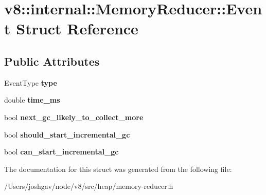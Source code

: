\hypertarget{structv8_1_1internal_1_1_memory_reducer_1_1_event}{}\section{v8\+:\+:internal\+:\+:Memory\+Reducer\+:\+:Event Struct Reference}
\label{structv8_1_1internal_1_1_memory_reducer_1_1_event}
\subsection*{Public Attributes}
\begin{DoxyCompactItemize}
\item 
Event\+Type {\bfseries type}\hypertarget{structv8_1_1internal_1_1_memory_reducer_1_1_event_a10deb19d76cb4bcb0ecadaf05e9cb878}{}\label{structv8_1_1internal_1_1_memory_reducer_1_1_event_a10deb19d76cb4bcb0ecadaf05e9cb878}

\item 
double {\bfseries time\+\_\+ms}\hypertarget{structv8_1_1internal_1_1_memory_reducer_1_1_event_a8bbd85b79f523bc8e8a79edfe2bdd74e}{}\label{structv8_1_1internal_1_1_memory_reducer_1_1_event_a8bbd85b79f523bc8e8a79edfe2bdd74e}

\item 
bool {\bfseries next\+\_\+gc\+\_\+likely\+\_\+to\+\_\+collect\+\_\+more}\hypertarget{structv8_1_1internal_1_1_memory_reducer_1_1_event_a56faabbcce0dd300632aced5b63eed43}{}\label{structv8_1_1internal_1_1_memory_reducer_1_1_event_a56faabbcce0dd300632aced5b63eed43}

\item 
bool {\bfseries should\+\_\+start\+\_\+incremental\+\_\+gc}\hypertarget{structv8_1_1internal_1_1_memory_reducer_1_1_event_a3e7d82cb205ad52638330a9eda53f185}{}\label{structv8_1_1internal_1_1_memory_reducer_1_1_event_a3e7d82cb205ad52638330a9eda53f185}

\item 
bool {\bfseries can\+\_\+start\+\_\+incremental\+\_\+gc}\hypertarget{structv8_1_1internal_1_1_memory_reducer_1_1_event_ae5968ba719482ceea0211f4df94157af}{}\label{structv8_1_1internal_1_1_memory_reducer_1_1_event_ae5968ba719482ceea0211f4df94157af}

\end{DoxyCompactItemize}


The documentation for this struct was generated from the following file\+:\begin{DoxyCompactItemize}
\item 
/\+Users/joshgav/node/v8/src/heap/memory-\/reducer.\+h\end{DoxyCompactItemize}
